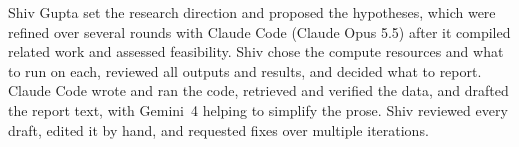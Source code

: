 Shiv Gupta set the research direction and proposed the hypotheses, which were refined over several rounds with Claude Code (Claude Opus 5.5) after it compiled related work and assessed feasibility. Shiv chose the compute resources and what to run on each, reviewed all outputs and results, and decided what to report. Claude Code wrote and ran the code, retrieved and verified the data, and drafted the report text, with Gemini~4 helping to simplify the prose. Shiv reviewed every draft, edited it by hand, and requested fixes over multiple iterations.
